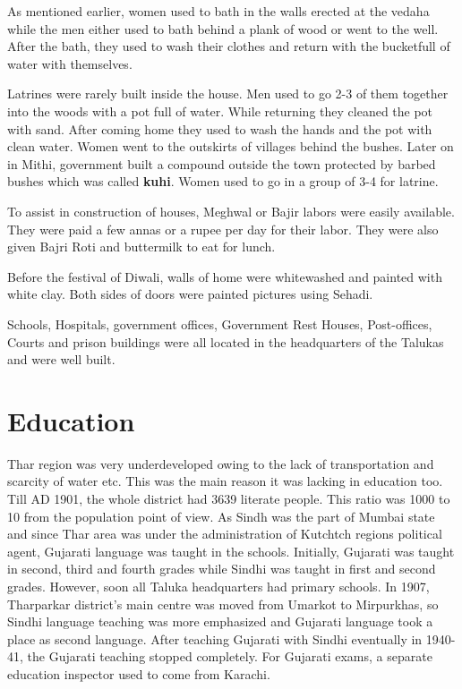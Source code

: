 As mentioned earlier, women used to bath in the walls erected at the vedaha
while the men either used to bath behind a plank of wood or went to the well.
After the bath, they used to wash their clothes and return with the
bucketfull of water with themselves.

Latrines were rarely built inside the house. Men used to go 2-3 of them together
into the woods with a pot full of water. While returning they cleaned the pot
with sand. After coming home they used to wash the hands and the pot with clean
water. Women went to the outskirts of villages behind the bushes. Later on in
Mithi, government built a compound outside the town protected by barbed bushes
which was called \textbf{kuhi}. Women used to go in a group of 3-4 for latrine.

To assist in construction of houses, Meghwal or Bajir labors were easily
available. They were paid a few annas or a rupee per day for their labor. They
were also given Bajri Roti and buttermilk to eat for lunch.

Before the festival of Diwali, walls of home were whitewashed and painted with
white clay. Both sides of doors were painted pictures using Sehadi.

Schools, Hospitals, government offices, Government Rest Houses, Post-offices,
Courts and prison buildings were all located in the headquarters of the Talukas
and were well built.

\section{Education}
Thar region was very underdeveloped owing to the lack of transportation and
scarcity of water etc. This was the main reason it was lacking in education too.
Till AD 1901, the whole district had 3639 literate people. This ratio was 1000
to 10 from the population point of view.
As Sindh was the part of Mumbai state and since Thar area was under the
administration of Kutchtch regions political agent, Gujarati language was taught
in the schools. Initially, Gujarati was taught in second, third and fourth
grades while Sindhi was taught in first and second grades. However, soon all
Taluka headquarters had primary schools. In 1907, Tharparkar district's main
centre was moved from Umarkot to Mirpurkhas, so Sindhi language teaching was
more emphasized and Gujarati language took a place as second language. After
teaching Gujarati with Sindhi eventually in 1940-41, the Gujarati teaching
stopped completely. For Gujarati exams, a separate education inspector used to
come from Karachi.

